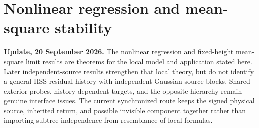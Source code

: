 \documentclass[11pt,oneside,openany,a4paper]{book}
\numberwithin{equation}{chapter}
\theoremstyle{definition}
\theoremstyle{remark}
\newcommand{\R}{\mathbb R}\newcommand{\E}{\mathbb E}\newcommand{\Prb}{\mathbb P}\newcommand{\PP}{\mathbb P}
\newcommand{\F}[1]{\left\lVert#1\right\rVert_F}
\newcommand{\op}[1]{\left\lVert#1\right\rVert_{\rm op}}
\DeclareMathOperator{\tr}{tr}\DeclareMathOperator{\rank}{rank}
\DeclareMathOperator{\diag}{blockdiag}\DeclareMathOperator{\range}{range}
\DeclareMathOperator{\ran}{range}\DeclareMathOperator{\OPT}{OPT}
\begin{document}
\endgroup

\begingroup
\let\E\relax
\newcommand{\E}{\mathbb E}
\let\R\relax
\newcommand{\R}{\mathbb R}
\let\Id\relax
\newcommand{\Id}{\mathrm I}
\let\F\relax
\newcommand{\F}[1]{\lVert #1\rVert_F}
\let\op\relax
\newcommand{\op}[1]{\lVert #1\rVert_{\mathrm{op}}}
\let\tr\relax
\newcommand{\tr}{\operatorname{tr}}
\let\ran\relax
\newcommand{\ran}{\operatorname{range}}
\let\diag\relax
\newcommand{\diag}{\operatorname{blockdiag}}
\let\rank\relax
\newcommand{\rank}{\operatorname{rank}}
\let\OPT\relax
\newcommand{\OPT}{\operatorname{OPT}}
\let\dist\relax
\newcommand{\dist}{\operatorname{dist}}
\chapter{Nonlinear regression and mean-square stability}\label{ch:nonlinear}
\begin{scopebox}
\textbf{Update, 20 September 2026.} The nonlinear regression and fixed-height mean-square limit results are theorems for the local model and application stated here. Later independent-source results strengthen that local theory, but do not identify a general HSS residual history with independent Gaussian source blocks. Shared exterior probes, history-dependent targets, and the opposite hierarchy remain genuine interface issues. The current synchronized route keeps the signed physical source, inherited return, and possible invisible component together rather than importing subtree independence from resemblance of local formulas.
\end{scopebox}
\end{document}
